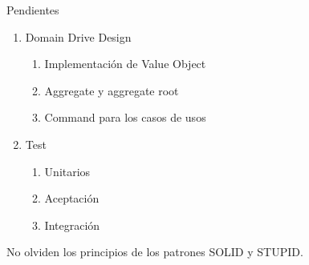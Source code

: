 \documentclass[10pt]{beamer}
\begin{document}
\begin{frame}[fragile]{Pendientes}

\begin{enumerate}
	\item Domain Drive Design
	\begin{enumerate}
		\item Implementación de Value Object
		\item Aggregate y aggregate root
		\item Command para los casos de usos
	\end{enumerate}
	\item Test
		\begin{enumerate}
		\item Unitarios
		\item Aceptación
		\item Integración
	\end{enumerate}		
\end{enumerate}

No olviden los principios de los patrones SOLID y STUPID.

\end{frame}
\end{document}
